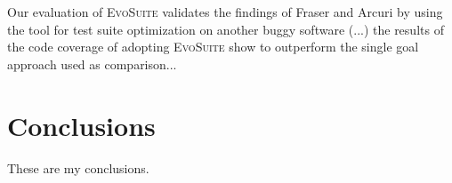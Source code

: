 \documentclass[pdftex,english,oribibl]{llncs}
\begin{document}
    Our evaluation of \textsc{EvoSuite} validates the findings of Fraser and Arcuri \cite{fraser2013whole} by using the tool for test suite optimization on another buggy software (...) the results of the code coverage of adopting \textsc{EvoSuite} show to outperform the single goal approach used as comparison... 
   

\section{Conclusions}\label{sec:conclusions}

  These are my conclusions.
  

\end{document}
